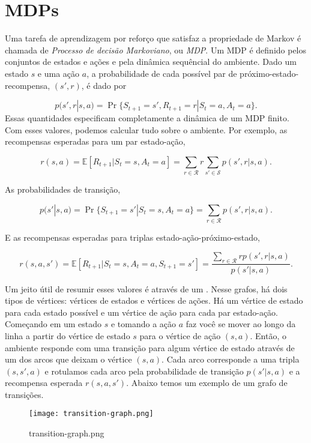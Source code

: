 \documentclass{article}
\begin{document}
\section{MDPs}

Uma tarefa de aprendizagem por reforço que satisfaz a propriedade de Markov é chamada de \textit{Processo de decisão Markoviano}, ou \textit{MDP}. Um MDP é definido pelos conjuntos de estados e ações e pela dinâmica sequêncial do ambiente. Dado um estado $s$ e uma ação $a$, a probabilidade de cada possível par de próximo-estado-recompensa, $(s',r)$, é dado por

\[
  p(s',r|s,a)=\Pr\{S_{t+1}=s',R_{t+1}=r|S_t=a,A_t=a\}
.\] 
Essas quantidades especificam completamente a dinâmica de um MDP finito. Com esses valores, podemos calcular tudo sobre o ambiente. Por exemplo, as recompensas esperadas para um par estado-ação,

\[
  r(s,a)=\mathbb{E}[R_{t+1} | S_t=s,A_t=a]=\sum_{r\in \mathcal{R}}r \sum_{s'\in \mathcal{S}} p(s',r|s,a)
.\] 

As probabilidades de transição,

\[
  p(s'|s,a)=\Pr\{S_{t+1}=s'|S_t=s,A_t=a\} = \sum_{r \in \mathcal{R}} p(s',r|s,a)
.\] 

E as recompensas esperadas para triplas estado-ação-próximo-estado,

\[
  r(s,a,s')=\mathbb{E}[R_{t+1} | S_t=s,A_t=a,S_{t+1}=s'] = \frac{\sum_{r \in \mathcal{R}}rp(s',r|s,a)}{p(s'|s,a)}
.\] 


Um jeito útil de resumir esses valores é através de um . Nesse grafos, há dois tipos de vértices: vértices de estados e vértices de ações. Há um vértice de estado para cada estado possível e um vértice de ação para cada par estado-ação. Começando em um estado $s$ e tomando a ação $a$ faz você se mover ao longo da linha a partir do vértice de estado $s$ para o vértice de ação $(s,a)$. Então, o ambiente responde com uma transição para algum vértice de estado através de um dos arcos que deixam o vértice $(s,a)$. Cada arco corresponde a uma tripla $(s,s',a)$ e rotulamos cada arco pela probabilidade de transição $p(s'|s,a)$ e a recompensa esperada $r(s,a,s')$. Abaixo temos um exemplo de um grafo de transições.

\begin{figure}[htpb]
  \centering
  \texttt{[image: transition-graph.png]}
  \caption{transition-graph.png}
  \label{fig:transition-graph-png}
\end{figure}
\end{document}
